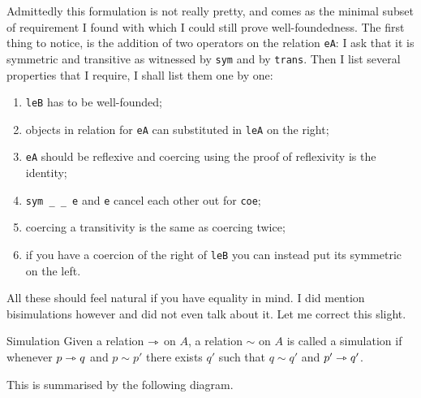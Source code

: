 Admittedly this formulation is not really pretty, and comes as the minimal
subset of requirement I found with which I could still prove well-foundedness.
The first thing to notice, is the addition of two operators on the relation
\texttt{eA}: I ask that it is symmetric and transitive as witnessed
by \texttt{sym} and by \texttt{trans}.
Then I list several properties that I require, I shall list them one by one:
\begin{enumerate}[label=(\roman*)]
  \item \texttt{leB} has to be well-founded;
  \item \label{item:dlexmod-sim} objects in relation for \texttt{eA}
  can substituted in \texttt{leA} on the right;
  \item \texttt{eA} should be reflexive and coercing using the proof
  of reflexivity is the identity;
  \item \texttt{sym _ _ e} and \texttt{e} cancel each other
  out for \texttt{coe};
  \item coercing a transitivity is the same as coercing twice;
  \item if you have a coercion of the right of \texttt{leB} you can
  instead put its symmetric on the left.
\end{enumerate}

All these should feel natural if you have equality in mind.
I did mention bisimulations however and did not even talk about it.
Let me correct this slight.

\begin{definition}{Simulation}
  Given a relation \(\rightarrowtriangle\) on \(A\), a relation \(\sim\) on \(A\) is called a
  simulation if whenever \(p \rightarrowtriangle q\) and \(p \sim p'\) there exists \(q'\)
  such that \(q \sim q'\) and \(p' \rightarrowtriangle q'\).
\end{definition}

This is summarised by the following diagram.
\begin{center}
\end{center}

